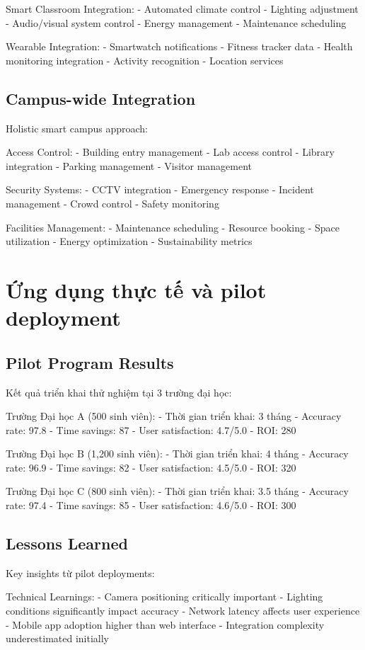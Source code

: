 \documentclass[12pt,a4paper]{report}
\begin{document}
Smart Classroom Integration:
- Automated climate control
- Lighting adjustment
- Audio/visual system control
- Energy management
- Maintenance scheduling

Wearable Integration:
- Smartwatch notifications
- Fitness tracker data
- Health monitoring integration
- Activity recognition
- Location services

\subsection{Campus-wide Integration}
Holistic smart campus approach:

Access Control:
- Building entry management
- Lab access control
- Library integration
- Parking management
- Visitor management

Security Systems:
- CCTV integration
- Emergency response
- Incident management
- Crowd control
- Safety monitoring

Facilities Management:
- Maintenance scheduling
- Resource booking
- Space utilization
- Energy optimization
- Sustainability metrics

\section{Ứng dụng thực tế và pilot deployment}
\subsection{Pilot Program Results}
Kết quả triển khai thử nghiệm tại 3 trường đại học:

Trường Đại học A (500 sinh viên):
- Thời gian triển khai: 3 tháng
- Accuracy rate: 97.8%
- Time savings: 87%
- User satisfaction: 4.7/5.0
- ROI: 280%

Trường Đại học B (1,200 sinh viên):
- Thời gian triển khai: 4 tháng
- Accuracy rate: 96.9%
- Time savings: 82%
- User satisfaction: 4.5/5.0
- ROI: 320%

Trường Đại học C (800 sinh viên):
- Thời gian triển khai: 3.5 tháng
- Accuracy rate: 97.4%
- Time savings: 85%
- User satisfaction: 4.6/5.0
- ROI: 300%

\subsection{Lessons Learned}
Key insights từ pilot deployments:

Technical Learnings:
- Camera positioning critically important
- Lighting conditions significantly impact accuracy
- Network latency affects user experience
- Mobile app adoption higher than web interface
- Integration complexity underestimated initially
\end{document}

